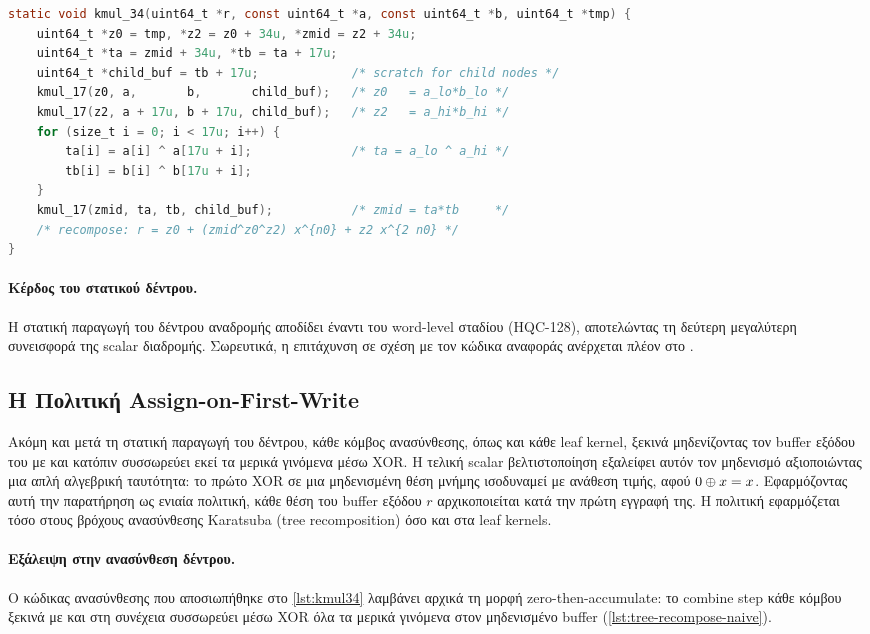 \begin{lstlisting}[language=C,caption={Παραγόμενος κόμβος \code{kmul\_34}.},label={lst:kmul34}]
static void kmul_34(uint64_t *r, const uint64_t *a, const uint64_t *b, uint64_t *tmp) {
    uint64_t *z0 = tmp, *z2 = z0 + 34u, *zmid = z2 + 34u;
    uint64_t *ta = zmid + 34u, *tb = ta + 17u;
    uint64_t *child_buf = tb + 17u;             /* scratch for child nodes */
    kmul_17(z0, a,       b,       child_buf);   /* z0   = a_lo*b_lo */
    kmul_17(z2, a + 17u, b + 17u, child_buf);   /* z2   = a_hi*b_hi */
    for (size_t i = 0; i < 17u; i++) {
        ta[i] = a[i] ^ a[17u + i];              /* ta = a_lo ^ a_hi */
        tb[i] = b[i] ^ b[17u + i];
    }
    kmul_17(zmid, ta, tb, child_buf);           /* zmid = ta*tb     */
    /* recompose: r = z0 + (zmid^z0^z2) x^{n0} + z2 x^{2 n0} */
}
\end{lstlisting}

\paragraph{Κέρδος του στατικού δέντρου.}
Η στατική παραγωγή του δέντρου αναδρομής αποδίδει
 έναντι του word-level \clmul{} σταδίου (HQC-128),
αποτελώντας τη δεύτερη μεγαλύτερη συνεισφορά της scalar διαδρομής.
Σωρευτικά, η επιτάχυνση σε σχέση με τον κώδικα αναφοράς
ανέρχεται πλέον στο .

\subsection{Η Πολιτική Assign-on-First-Write}
\label{ssec:memset-elimination}

Ακόμη και μετά τη στατική παραγωγή του δέντρου, κάθε κόμβος ανασύνθεσης, όπως
και κάθε leaf kernel, ξεκινά μηδενίζοντας τον buffer εξόδου του με 
και κατόπιν συσσωρεύει εκεί τα μερικά γινόμενα μέσω XOR. 
Η τελική scalar βελτιστοποίηση εξαλείφει
αυτόν τον μηδενισμό αξιοποιώντας μια απλή αλγεβρική ταυτότητα: το πρώτο XOR σε
μια μηδενισμένη θέση μνήμης ισοδυναμεί με ανάθεση τιμής, αφού $0 \oplus x = x$.
Εφαρμόζοντας αυτή την παρατήρηση ως ενιαία 
πολιτική, κάθε θέση του buffer εξόδου $r$ αρχικοποιείται κατά την πρώτη εγγραφή της.
Η πολιτική εφαρμόζεται τόσο στους βρόχους ανασύνθεσης Karatsuba
(tree recomposition) όσο και στα leaf kernels.

\paragraph{Εξάλειψη  στην ανασύνθεση δέντρου.}
Ο κώδικας ανασύνθεσης που αποσιωπήθηκε στο \cref{lst:kmul34} λαμβάνει αρχικά
τη μορφή zero-then-accumulate: το combine step κάθε κόμβου ξεκινά με
 και στη συνέχεια συσσωρεύει μέσω XOR όλα τα μερικά
γινόμενα στον μηδενισμένο buffer (\cref{lst:tree-recompose-naive}).

